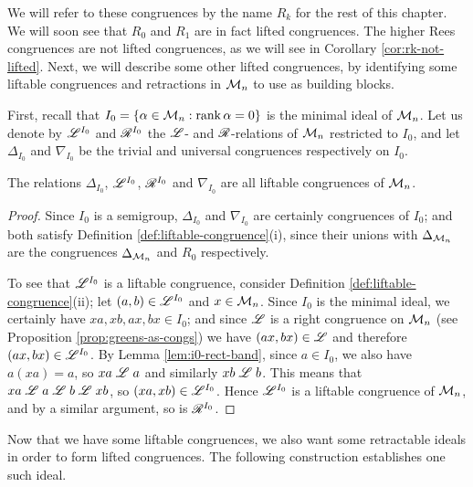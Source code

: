We will refer to these congruences by the name $R_k$ for the rest of this
chapter.  We will soon see that $R_0$ and $R_1$ are in fact lifted congruences.
The higher Rees congruences are not lifted congruences, as we will see in
Corollary \ref{cor:rk-not-lifted}.  Next, we will describe some other lifted
congruences, by identifying some liftable congruences and retractions in
$\mathcal{M}_n$ to use as building blocks.

First, recall that $I_0 = \{\alpha \in \mathcal{M}_n : \operatorname{rank} \alpha = 0\}$ is the
minimal ideal of $\mathcal{M}_n$.  Let us denote by $\mathrel{\mathscr{L}}^{I_0}$ and $\mathrel{\mathscr{R}}^{I_0}$ the $\mathrel{\mathscr{L}}$- and
$\mathrel{\mathscr{R}}$-relations of $\mathcal{M}_n$ restricted to $I_0$, and let $\Delta_{I_0}$ and
$\nabla_{I_0}$ be the trivial and universal congruences respectively on $I_0$.

\begin{proposition}
  The relations $\Delta_{I_0}$, $\mathscr{L}^{I_0}$, $\mathscr{R}^{I_0}$ and $\nabla_{I_0}$ are all
  liftable congruences of $\mathcal{M}_n$.
  \begin{proof}
    Since $I_0$ is a semigroup, $\Delta_{I_0}$ and $\nabla_{I_0}$ are certainly
    congruences of $I_0$; and both satisfy Definition
    \ref{def:liftable-congruence}(i), since their unions with $\Delta_{\mathcal{M}_n}$
    are the congruences $\Delta_{\mathcal{M}_n}$ and $R_0$ respectively.

    To see that $\mathscr{L}^{I_0}$ is a liftable congruence, consider Definition
    \ref{def:liftable-congruence}(ii); let $(a,b) \in \mathscr{L}^{I_0}$ and
    $x \in \mathcal{M}_n$.  Since $I_0$ is the minimal ideal, we certainly have
    $xa,xb,ax,bx \in I_0$; and since $\mathrel{\mathscr{L}}$ is a right congruence on $\mathcal{M}_n$
    (see Proposition \ref{prop:greens-as-congs}) we have $(ax,bx) \in \mathscr{L}$ and
    therefore $(ax,bx) \in \mathscr{L}^{I_0}$.  By Lemma \ref{lem:i0-rect-band}, since $a \in I_0$, we also have
    $a(xa) = a$, so $xa \mathrel{\mathscr{L}} a$ and similarly $xb \mathrel{\mathscr{L}} b$.  This means that
    $xa \mathrel{\mathscr{L}} a \mathrel{\mathscr{L}} b \mathrel{\mathscr{L}} xb$, so $(xa, xb) \in \mathscr{L}^{I_0}$.  Hence $\mathscr{L}^{I_0}$ is a
    liftable congruence of $\mathcal{M}_n$, and by a similar argument, so is $\mathscr{R}^{I_0}$.
  \end{proof}
\end{proposition}

Now that we have some liftable congruences, we also want some retractable ideals
in order to form lifted congruences.  The following construction establishes one
such ideal.

